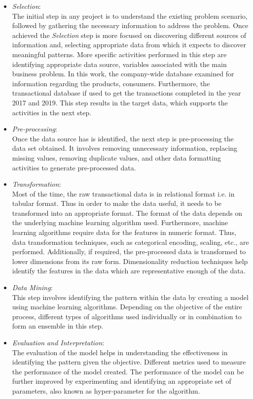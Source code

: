 \begin{itemize}
    \item \textit{Selection}: \\
The initial step in any project is to understand the existing problem scenario, followed by gathering the necessary information to address the problem. Once achieved the \textit{Selection} step is more focused on discovering different sources of information and, selecting appropriate data from which it expects to discover meaningful patterns.  More specific activities performed in this step are identifying appropriate data source, variables associated with the main business problem. In this work, the company-wide database examined for information regarding the products, consumers. Furthermore, the transactional database if used to get the transactions completed in the year 2017 and 2019.  This step results in the target data, which supports the activities in the next step.

    \item \textit{Pre-processing}: \\
    Once the data source has is identified, the next step is pre-processing the data set obtained. It involves removing unnecessary information, replacing missing values, removing duplicate values, and other data formatting activities to generate pre-processed data. 
    
    \item \textit{Transformation}:\\
     Most of the time, the raw transactional data is in relational format i.e. in tabular format. Thus in order to make the data useful, it needs to be transformed into an appropriate format. The format of the data depends on the underlying machine learning algorithm used. Furthermore, machine learning algorithms require data for the features in numeric format. Thus, data transformation techniques, such as categorical encoding, scaling, etc., are performed. Additionally, if required, the pre-processed data is transformed to lower dimensions from its raw form. Dimensionality reduction techniques help identify the features in the data which are representative enough of the data. 
    \item \textit{Data Mining}:\\
    This step involves identifying the pattern within the data by creating a model using machine learning algorithms. Depending on the objective of the entire process, different types of algorithms used individually or in combination to form an ensemble in this step.  
    \item \textit{Evaluation and Interpretation}:\\
    The evaluation of the model helps in understanding the effectiveness in identifying the pattern given the objective. Different metrics used to measure the performance of the model created. The performance of the model can be further improved by experimenting and identifying an appropriate set of parameters, also known as hyper-parameter for the algorithm.  
\end{itemize}


